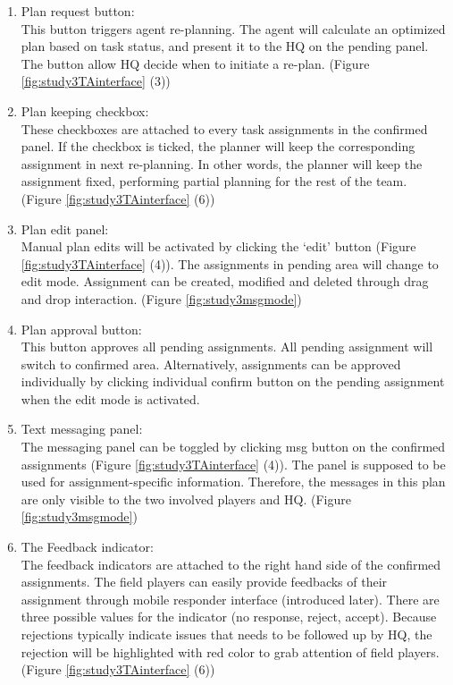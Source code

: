 \begin{enumerate}
\item Plan request button: \\
This button triggers agent re-planning. The agent will calculate an optimized plan based on task status, and present it to the HQ on the pending panel. The button allow HQ decide when to initiate a re-plan. (Figure \ref{fig:study3TAinterface} (3))\\

\item Plan keeping checkbox:\\
These checkboxes are attached to every task assignments in the confirmed panel. If the checkbox is ticked, the planner will keep the corresponding assignment in next re-planning. In other words, the planner will keep the assignment fixed, performing partial planning for the rest of the team. (Figure \ref{fig:study3TAinterface} (6))

\item Plan edit panel: \\
Manual plan edits will be activated by clicking the `edit' button (Figure \ref{fig:study3TAinterface} (4)). The assignments in pending area will change to edit mode. Assignment can be created, modified and deleted through drag and drop interaction. (Figure \ref{fig:study3msgmode}) \\

\item Plan approval button: \\
This button approves all pending assignments. All pending assignment will switch to confirmed area. Alternatively, assignments can be approved individually by clicking individual confirm button on the pending assignment when the edit mode is activated. \\

\item Text messaging panel:\\
The messaging panel can be toggled by clicking msg button on the confirmed assignments (Figure \ref{fig:study3TAinterface} (4)). The panel is supposed to be used for assignment-specific information. Therefore, the messages in this plan are only visible to the two involved players and HQ. (Figure \ref{fig:study3msgmode}) \\

\item The Feedback indicator:\\
The feedback indicators are attached to the right hand side of the confirmed assignments. The field players can easily provide feedbacks of their assignment through mobile responder interface (introduced later). There are three possible values for the indicator (no response, reject, accept). Because rejections typically indicate issues that needs to be followed up by HQ, the rejection will be highlighted with red color to grab attention of field players. (Figure  \ref{fig:study3TAinterface} (6))\\


\end{enumerate}
